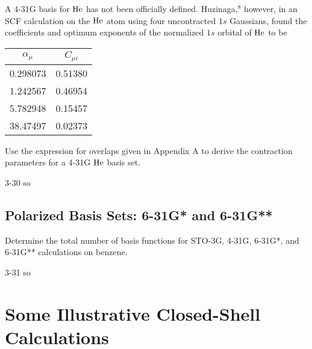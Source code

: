 \documentclass[a4paper]{book}
\begin{document}
	\begin{exercise}
	A 4-31G basis for $\ce{He}$ has not been officially defined. Huzinaga,${}^8$ however, in an SCF calculation on the $\ce{He}$ atom using four uncontracted $1s$ Gaussians, found the coefficients and optimum exponents of the normalized $1s$ orbital of $\ce{He}$ to be
	\begin{center}
	\begin{tabular}{cc} \hline
		$\alpha_\mu$ 	& $C_{\mu i}$ 	\\ \hline
		0.298073		& 0.51380		\\
		1.242567		& 0.46954 		\\
		5.782948		& 0.15457		\\
		38.47497		& 0.02373		\\ \hline
	\end{tabular}
	\end{center}
	Use the expression for overlaps given in Appendix A to derive the contraction parameters for a 4-31G $\ce{He}$ basis set.
	\end{exercise}
	
	\begin{solution}
		3-30 so
	\end{solution}
	
	\subsection{Polarized Basis Sets: 6-31G* and 6-31G**}
	
	\begin{exercise}
	Determine the total number of basis functions for STO-3G, 4-31G, 6-31G*, and 6-31G** calculations on benzene.
	\end{exercise}
	
	\begin{solution}
		3-31 so
	\end{solution}
	
	\section{Some Illustrative Closed-Shell Calculations}
	
\end{document}
